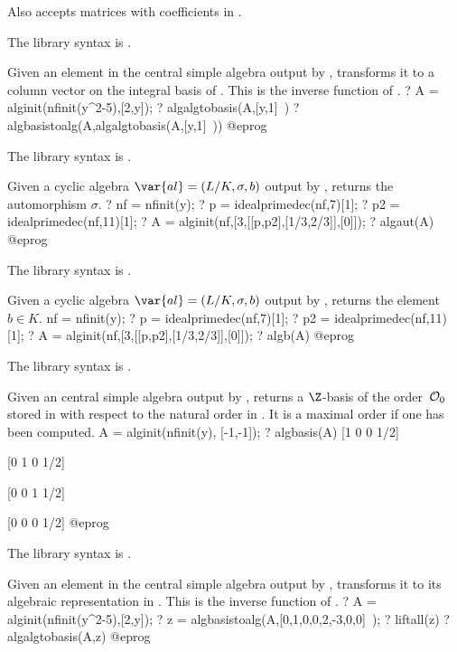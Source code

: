 Also accepts matrices with coefficients in .

The library syntax is .

\label{se:algalgtobasis}
Given an element  in the central simple algebra  output
by , transforms it to a column vector on the integral basis of
. This is the inverse function of .
\bprog
? A = alginit(nfinit(y^2-5),[2,y]);
? algalgtobasis(A,[y,1]~)
? algbasistoalg(A,algalgtobasis(A,[y,1]~))
@eprog

The library syntax is .

\label{se:algaut}
Given a cyclic algebra $\var{al} = (L/K,\sigma,b)$ output by
, returns the automorphism $\sigma$.
\bprog
? nf = nfinit(y);
? p = idealprimedec(nf,7)[1];
? p2 = idealprimedec(nf,11)[1];
? A = alginit(nf,[3,[[p,p2],[1/3,2/3]],[0]]);
? algaut(A)
@eprog

The library syntax is .

\label{se:algb}
Given a cyclic algebra $\var{al} = (L/K,\sigma,b)$ output by
, returns the element $b\in K$.
\bprog
nf = nfinit(y);
? p = idealprimedec(nf,7)[1];
? p2 = idealprimedec(nf,11)[1];
? A = alginit(nf,[3,[[p,p2],[1/3,2/3]],[0]]);
? algb(A)
@eprog

The library syntax is .

\label{se:algbasis}
Given an central simple algebra  output by , returns
a $\Z$-basis of the order~${\cal O}_0$ stored in  with respect to the
natural order in . It is a maximal order if one has been computed.
\bprog
A = alginit(nfinit(y), [-1,-1]);
? algbasis(A)
[1 0 0 1/2]

[0 1 0 1/2]

[0 0 1 1/2]

[0 0 0 1/2]
@eprog

The library syntax is .

\label{se:algbasistoalg}
Given an element  in the central simple algebra  output
by , transforms it to its algebraic representation in .
This is the inverse function of .
\bprog
? A = alginit(nfinit(y^2-5),[2,y]);
? z = algbasistoalg(A,[0,1,0,0,2,-3,0,0]~);
? liftall(z)
? algalgtobasis(A,z)
@eprog

